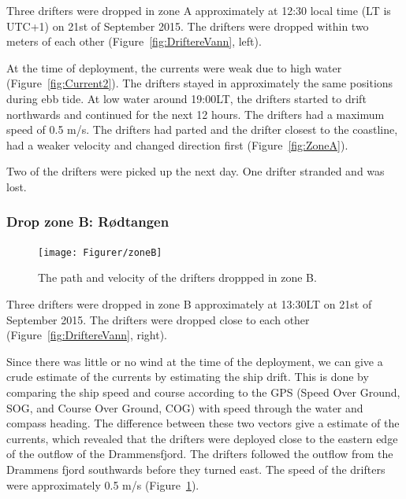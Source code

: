 \documentclass[12pt,a4paper,english]{article}
\begin{document}
Three drifters were dropped in zone A approximately at 12:30 local time (LT is UTC+1) on 21st of September 2015. The drifters were dropped within two meters of each other (Figure~\ref{fig:DriftereVann}, left).

At the time of deployment, the currents were weak due to high water (Figure~\ref{fig:Current2}). The drifters stayed in approximately the same positions during ebb tide. At low water around 19:00LT, the drifters started to drift northwards and continued for the next 12 hours. The drifters had a maximum speed of 0.5 m/s.%
The drifters had parted and the drifter closest to the coastline, had a weaker velocity and changed direction first (Figure~\ref{fig:ZoneA}). 

Two of the drifters were picked up the next day. One drifter stranded and was lost. 

\subsubsection{Drop zone B: R\o dtangen}
\label{sect:ZoneB}
%
\begin{figure}[ht]
\centerline{
\texttt{[image: Figurer/zoneB]}}
\caption{\small
The path and velocity of the drifters droppped in zone B.}
\label{fig:ZoneB}
\end{figure}
%
%
Three drifters were dropped in zone B approximately at 13:30LT on 21st of September 2015. The drifters were dropped close to each other (Figure~\ref{fig:DriftereVann}, right).

Since there was little or no wind at the time of the deployment, we can give a crude estimate of the currents by estimating the ship drift. This is done by comparing the ship speed and course according to the GPS (Speed Over Ground, SOG, and Course Over Ground, COG) with speed through the water and compass heading. The difference between these two vectors give a estimate of the currents, which revealed that the drifters were deployed close to the eastern edge of the outflow of the Drammensfjord. The drifters followed the outflow from the Drammens fjord southwards before they turned east. The speed of the drifters were approximately 0.5 m/s (Figure~\ref{fig:ZoneB}). %
\end{document}
